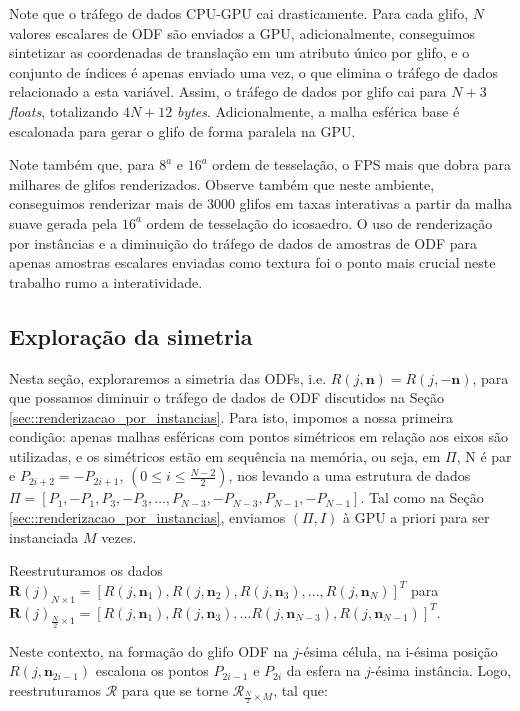 \documentclass[
    12pt,                %
    oneside,            %
    a4paper,            %
    english,            %
    french,                %
    spanish,            %
    brazil                %
    ]{abntex2}
\begin{document}
Note que o tráfego de dados CPU-GPU cai drasticamente. Para cada glifo, $N$ valores escalares de ODF são enviados a GPU, adicionalmente, conseguimos sintetizar as coordenadas de translação em um atributo único por glifo, e o conjunto de índices é apenas enviado uma vez, o que elimina o tráfego de dados relacionado a esta variável. Assim, o tráfego de dados por glifo cai para $N + 3$ \textit{floats}, totalizando $4N + 12$ \textit{bytes}. Adicionalmente, a malha esférica base é escalonada para gerar o glifo de forma paralela na GPU.

Note também que, para $8^a$ e $16^a$ ordem de tesselação, o FPS mais que dobra para milhares de glifos renderizados. Observe também que neste ambiente, conseguimos renderizar mais de 3000 glifos em taxas interativas \cite{nielsen1994} a partir da malha suave gerada pela $16^a$ ordem de tesselação do icosaedro. O uso de renderização por instâncias e a diminuição do tráfego de dados de amostras de ODF para apenas amostras escalares enviadas como textura foi o ponto mais crucial neste trabalho rumo a interatividade.

\subsection{Exploração da simetria}
\label{sec::otimizacao_da_simetria}

Nesta seção, exploraremos a simetria das ODFs, i.e. $R(j, \mathbf{n}) = R(j, -\mathbf{n})$, para que possamos diminuir o tráfego de dados de ODF discutidos na Seção \ref{sec::renderizacao_por_instancias}. Para isto, impomos a nossa primeira condição: apenas malhas esféricas com pontos simétricos em relação aos eixos são utilizadas, e os simétricos estão em sequência na memória, ou seja, em $\Pi$, N é par e $P_{2i+2} = -P_{2i+1}$, $(0 \leq i \leq \frac{N-2}{2})$, nos levando a uma estrutura de dados $\Pi = [P_1, -P_1, P_3, -P_3, \dots, P_{N-3}, -P_{N-3}, P_{N-1}, -P_{N-1}]$. Tal como na Seção \ref{sec::renderizacao_por_instancias}, enviamos $(\Pi, I)$ à GPU a priori para ser instanciada $M$ vezes.

Reestruturamos os dados
$\boldsymbol{R}(j)_{N\times 1} = [
R(j, \mathbf{n}_1), 
R(j, \mathbf{n}_2), 
R(j, \mathbf{n}_3), ..., 
R(j, \mathbf{n}_N)
]^T$ para
$\boldsymbol{R}(j)_{\frac{N}{2}\times 1} =[
R(j, \mathbf{n}_1), 
R(j, \mathbf{n}_3), ...
R(j, \mathbf{n}_{N-3}),
R(j, \mathbf{n}_{N-1})
]^T$.

Neste contexto, na formação do glifo ODF na $j$-ésima célula, na i-ésima posição $R(j, \mathbf{n}_{2i-1})$ escalona os pontos $P_{2i-1}$ e $P_{2i}$ da esfera na $j$-ésima instância. Logo, reestruturamos $\boldsymbol{\mathscr{R}}$ para que se torne $\boldsymbol{\mathscr{R}}_{\frac{N}{2}\times M}$, tal que:
\end{document}
